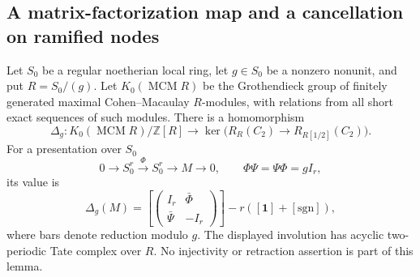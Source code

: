 \subsection{A matrix-factorization map and a cancellation on ramified nodes}

\begin{lemma}
\label{C:MF-Swan-transfer}
Let $S_0$ be a regular noetherian local ring, let
$g\in S_0$ be a nonzero nonunit, and put $R=S_0/(g)$.
Let $K_0(\operatorname{MCM}R)$ be the Grothendieck group
of finitely generated maximal Cohen--Macaulay $R$-modules,
with relations from all short exact sequences of such modules.
There is a homomorphism
\[
 \Delta_g:K_0(\operatorname{MCM}R)/\mathbb Z[R]
   \longrightarrow
   \ker\bigl(R_R(C_2)\longrightarrow R_{R[1/2]}(C_2)\bigr).
                                                               \tag{C.1.MF1}
\]
For a presentation over $S_0$
\[
 0\longrightarrow S_0^r\xrightarrow{\Phi}S_0^r
       \longrightarrow M\longrightarrow0,
 \qquad \Phi\Psi=\Psi\Phi=gI_r,
\]
its value is
\[
 \Delta_g(M)=
 \left[\begin{pmatrix}I_r&\bar\Phi\\
                        \bar\Psi&-I_r\end{pmatrix}\right]
       -r([\mathbf1]+[\mathrm{sgn}]),                 \tag{C.1.MF2}
\]
where bars denote reduction modulo $g$.
The displayed involution has acyclic two-periodic Tate
complex over $R$.
No injectivity or retraction assertion is part of this lemma.
\end{lemma}
